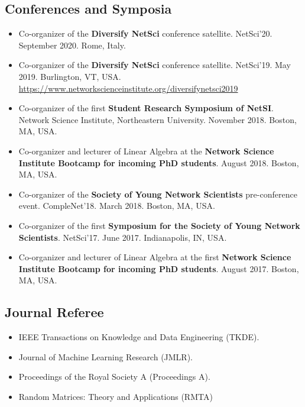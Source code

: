 \documentclass[12pt,]{scrartcl}
\newenvironment{myitemize}
{ \begin{itemize}
    \setlength{\itemsep}{5pt}
    \setlength{\parskip}{0pt}
    \setlength{\parsep}{0pt}     }
{ \end{itemize}                  }
\begin{document}
\subsection{Conferences and Symposia}\label{conferences}

\begin{myitemize}
\leftskip-0.25in

\item Co-organizer of the \textbf{Diversify NetSci} conference satellite. NetSci'20. September 2020. Rome, Italy.

\item Co-organizer of the \textbf{Diversify NetSci} conference satellite. NetSci'19. May 2019. Burlington, VT, USA. \url{https://www.networkscienceinstitute.org/diversifynetsci2019}

\item Co-organizer of the first \textbf{Student Research Symposium of NetSI}. Network Science Institute, Northeastern University. November 2018. Boston, MA, USA.

\item Co-organizer and lecturer of Linear Algebra at the \textbf{Network Science Institute Bootcamp for incoming PhD students}. August 2018. Boston, MA, USA.

\item Co-organizer of the \textbf{Society of Young Network Scientists} pre-conference event. CompleNet'18. March 2018. Boston, MA, USA.

\item Co-organizer of the first \textbf{Symposium for the Society of Young Network Scientists}. NetSci'17. June 2017. Indianapolis, IN, USA.

\item Co-organizer and lecturer of Linear Algebra at the first \textbf{Network Science Institute Bootcamp for incoming PhD students}. August 2017. Boston, MA, USA.

\end{myitemize}


\subsection{Journal Referee}\label{journal-referee}

\begin{myitemize}
\leftskip-0.25in

\item IEEE Transactions on Knowledge and Data Engineering (TKDE).

\item Journal of Machine Learning Research (JMLR).

\item Proceedings of the Royal Society A (Proceedings A).

\item Random Matrices: Theory and Applications (RMTA)

\end{myitemize}
\end{document}
